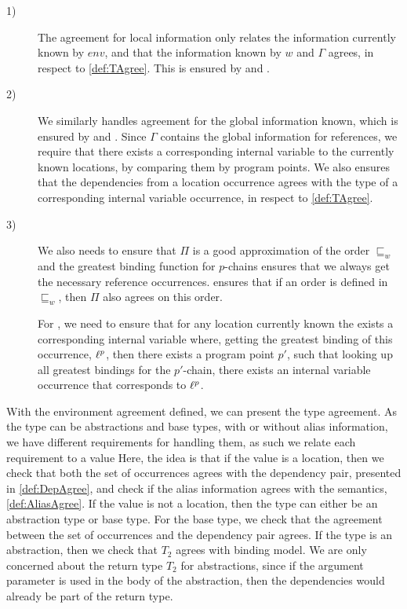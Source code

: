 \documentclass[acmsmall,sigplan]{acmart}
\begin{document}
\begin{description}
	\item[1)] The agreement for local information only relates the information currently known by $env$, and that the information known by $w$ and $\Gamma$ agrees, in respect to \cref{def:TAgree}.
		This is ensured by  and .

	\item[2)] We similarly handles agreement for the global information known, which is ensured by  and .
		Since $\Gamma$ contains the global information for references, we require that there exists a corresponding internal variable to the currently known locations, by comparing them by program points.
		We also ensures that the dependencies from a location occurrence agrees with the type of a corresponding internal variable occurrence, in respect to \cref{def:TAgree}.

	\item[3)] We also needs to ensure that $\Pi$ is a good approximation of the order $\sqsubseteq_w$ and the greatest binding function for $p$-chains ensures that we always get the necessary reference occurrences.
	 ensures that if an order is defined in $\sqsubseteq_w$, then $\Pi$ also agrees on this order.

	For , we need to ensure that for any location currently known the exists a corresponding internal variable where, getting the greatest binding of this occurrence, $\ell^p$, then there exists a program point $p'$, 
	such that looking up all greatest bindings for the $p'$-chain, there exists an internal variable occurrence that corresponds to $\ell^p$.
\end{description}
\bigskip

With the environment agreement defined, we can present the type agreement.
As the type can be abstractions and base types, with or without alias information, we have different requirements for handling them, as such we relate each requirement to a value
Here, the idea is that if the value is a location, then we check that both the set of occurrences agrees with the dependency pair, presented in \cref{def:DepAgree}, 
and check if the alias information agrees with the semantics, \cref{def:AliasAgree}.
If the value is not a location, then the type can either be an abstraction type or base type.
For the base type, we check that the agreement between the set of occurrences and the dependency pair agrees.
If the type is an abstraction, then we check that $T_2$ agrees with binding model.
We are only concerned about the return type $T_2$ for abstractions, since if the argument parameter is used in the body of the abstraction, then the dependencies would already be part of the return type.
\end{document}
